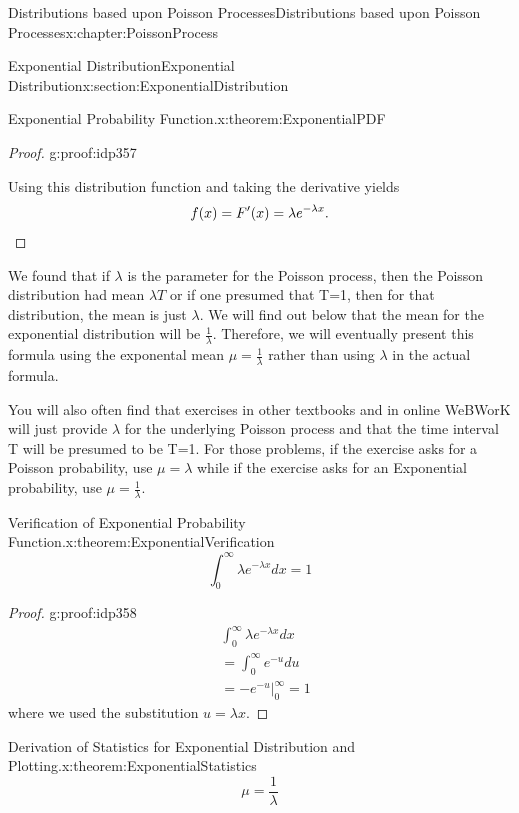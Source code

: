 \documentclass[oneside,10pt,]{book}
\newcommand{\qedhere}{\relax}
\numberwithin{equation}{section}
\begin{document}
\begin{chapterptx}{Distributions based upon Poisson Processes}{}{Distributions based upon Poisson Processes}{}{}{x:chapter:PoissonProcess}
\begin{sectionptx}{Exponential Distribution}{}{Exponential Distribution}{}{}{x:section:ExponentialDistribution}
\begin{theorem}{Exponential Probability Function.}{}{x:theorem:ExponentialPDF}
\begin{proof}{}{g:proof:idp357}
\par
Using this distribution function and taking the derivative yields%
\begin{equation*}
f(x) = F'(x) = \lambda e^{-\lambda x}.\qedhere
\end{equation*}
%
\end{proof}
%
\end{theorem}
%
\par
We found that if \(\lambda\) is the parameter for the Poisson process, then the Poisson distribution had mean \(\lambda T\) or if one presumed that T=1, then for that distribution, the mean is just \(\lambda\).  We will find out below that the mean for the exponential distribution will be \(\frac{1}{\lambda}\). Therefore, we will eventually present this formula using the exponental mean \(\mu = \frac{1}{\lambda}\) rather than using \(\lambda\) in the actual formula.%
\par
You will also often find that exercises in other textbooks and in online WeBWorK will just provide \(\lambda\) for the underlying Poisson process and that the time interval T will be presumed to be T=1.  For those problems, if the exercise asks for a Poisson probability, use \(\mu = \lambda\) while if the exercise asks for an Exponential probability, use \(\mu = \frac{1}{\lambda}\).%
\par
\begin{theorem}{Verification of Exponential Probability Function.}{}{x:theorem:ExponentialVerification}%
%
\begin{equation*}
\int_0^{\infty} \lambda e^{-\lambda x} dx = 1
\end{equation*}
%
\end{theorem}
\begin{proof}{}{g:proof:idp358}
%
\begin{align*}
& \int_0^{\infty} \lambda e^{-\lambda x} dx\\
& = \int_0^{\infty} e^{-u} du\\
& = -e^{-u} \big |_0^{\infty} = 1
\end{align*}
where we used the substitution \(u = \lambda x\).%
\end{proof}
%
\par
\begin{theorem}{Derivation of Statistics for Exponential Distribution and Plotting.}{}{x:theorem:ExponentialStatistics}%
%
\begin{equation*}
\mu = \frac{1}{\lambda}
\end{equation*}
%
\begin{equation*}

\end{equation*}
\end{theorem}
\end{sectionptx}
\end{chapterptx}
\end{document}
